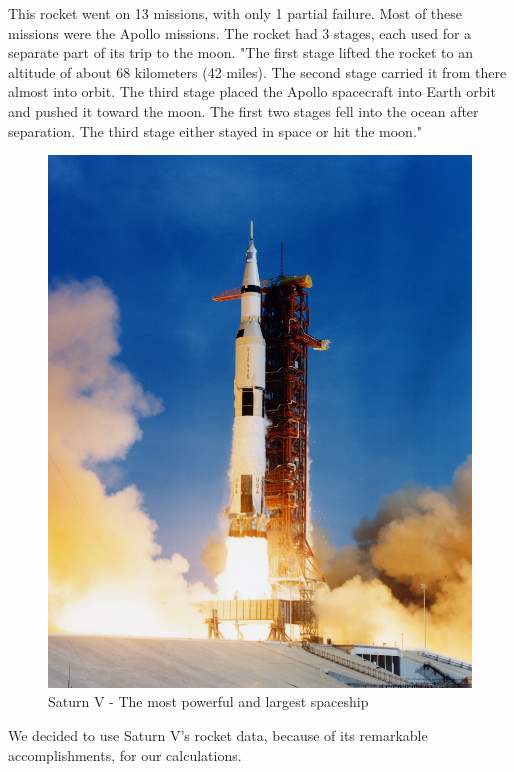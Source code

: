 \documentclass[11pt]{article}
\begin{document}
\vspace{.25cm}
This rocket went on 13 missions, with only 1 partial failure. Most of these missions were the Apollo missions. The rocket had 3 stages, each used for a separate part of its trip to the moon. "The first stage lifted the rocket to an altitude of about 68 kilometers (42 miles). The second stage carried it from there almost into orbit. The third stage placed the Apollo spacecraft into Earth orbit and pushed it toward the moon. The first two stages fell into the ocean after separation. The third stage either stayed in space or hit the moon." \cite{saturnv}

\begin{figure}[H]
\centering
\includegraphics[scale=0.35]{SaturnV.jpg}
\caption{Saturn V - The most powerful and largest spaceship}
\end{figure}

\vspace{.25cm}

We decided to use Saturn V's rocket data, because of its remarkable accomplishments, for our calculations.
\end{document}
